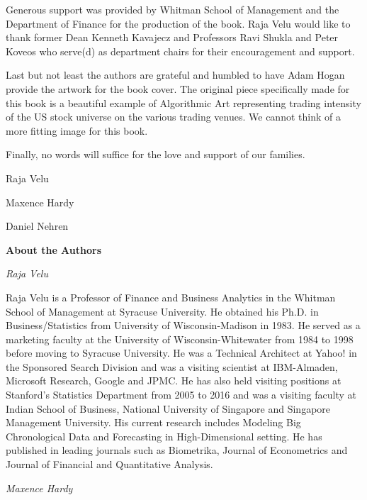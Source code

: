 Generous support was provided by Whitman School of Management and the Department of Finance for the production of the book. Raja Velu would like to thank former Dean Kenneth Kavajecz and Professors Ravi Shukla and Peter Koveos who serve(d) as department chairs for their encouragement and support.

Last but not least the authors are grateful and humbled to have Adam Hogan provide the artwork for the book cover. The original piece specifically made for this book is a beautiful example of  Algorithmic Art representing trading intensity of the US stock universe on the various trading venues. We cannot think of a more fitting image for this book.  


Finally, no words will suffice for the love and support of our families. \vspace{3\baselineskip}


\noindent Raja Velu \par
\noindent Maxence Hardy \par
\noindent Daniel Nehren



\newpage



{\noindent\Large\bfseries About the Authors} \vspace{1cm}


{\noindent\large\itshape Raja Velu} \medskip

\noindent Raja Velu is a Professor of Finance and Business Analytics in the Whitman School of Management at Syracuse University. He obtained his Ph.D. in Business/Statistics from University of Wisconsin-Madison in 1983. He served as a marketing faculty at the University of Wisconsin-Whitewater from 1984 to 1998 before moving to Syracuse University. He was a Technical Architect at Yahoo! in the Sponsored Search Division and was a visiting scientist at IBM-Almaden, Microsoft Research, Google and JPMC. He has also held visiting positions at Stanford's Statistics Department from 2005 to 2016 and was a visiting faculty at Indian School of Business, National University of Singapore and Singapore Management University. His current research includes Modeling Big Chronological Data and Forecasting in High-Dimensional setting. He has published in leading journals such as Biometrika, Journal of Econometrics and Journal of Financial and Quantitative Analysis. \bigskip


{\noindent\large\itshape Maxence Hardy} \medskip

